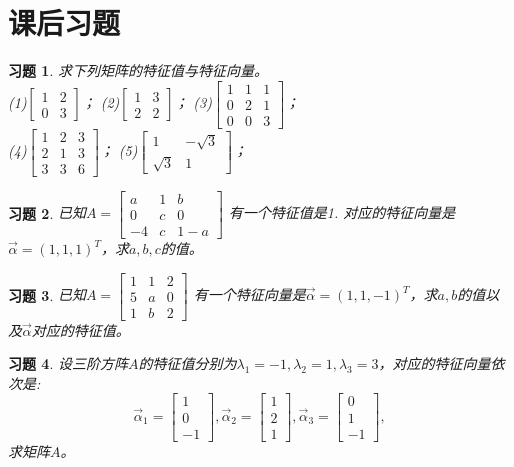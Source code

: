\documentclass[a4paper]{book}
\newtheorem{ex}{习题}[chapter]
\begin{document}
\section{课后习题}

\begin{ex}\label{7.1}
求下列矩阵的特征值与特征向量。\\
(1)$\begin{bmatrix}1&2\\0&3\end{bmatrix}$；
(2)$\begin{bmatrix}1&3\\2&2\end{bmatrix}$；
(3)$\begin{bmatrix}1&1&1\\0&2&1\\0&0&3\end{bmatrix}$；\\
(4)$\begin{bmatrix}1&2&3\\2&1&3\\3&3&6\end{bmatrix}$；
(5)$\begin{bmatrix}1&-\sqrt{3}\\ \sqrt{3}&1\end{bmatrix}$；
\end{ex}

\begin{ex}\label{7.2}
已知$A=\begin{bmatrix}a&1&b\\0&c&0\\-4&c&1-a\end{bmatrix}$ 有一个特征值是1. 对应的特征向量是$\vec{\alpha}=(1,1,1)^T$，求$a,b,c$的值。
\end{ex}

\begin{ex}\label{7.3}
已知$A=\begin{bmatrix}1&1&2\\5&a&0\\1&b&2\end{bmatrix}$ 有一个特征向量是$\vec{\alpha}=(1,1,-1)^T$，求$a,b$的值以及$\vec{\alpha}$对应的特征值。
\end{ex}

\begin{ex}\label{7.4}
设三阶方阵$A$的特征值分别为$\lambda_1=-1,\lambda_2=1,\lambda_3=3$，对应的特征向量依次是:
\begin{equation*}
\vec{\alpha}_1=\begin{bmatrix}1\\0\\-1\end{bmatrix},
\vec{\alpha}_2=\begin{bmatrix}1\\2\\1\end{bmatrix},
\vec{\alpha}_3=\begin{bmatrix}0\\1\\-1\end{bmatrix},
\end{equation*}
求矩阵$A$。
\end{ex}
\end{document}

